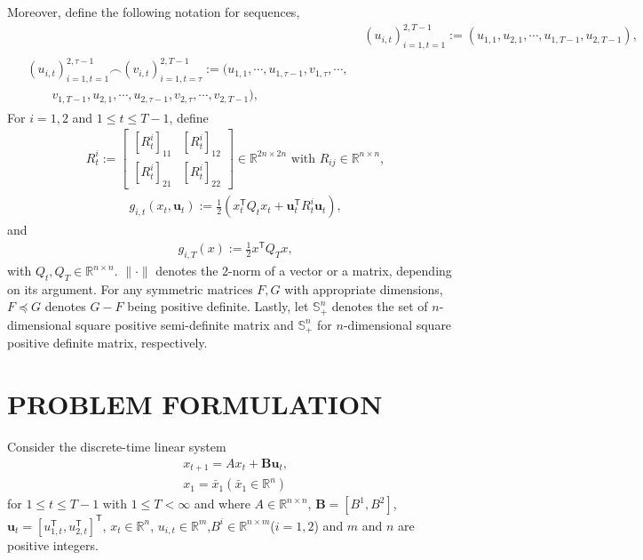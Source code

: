 \documentclass[letterpaper, 10 pt, conference]{ieeeconf}  %
\newcommand{\transpose}{\mathsf{T}}
\begin{document}
Moreover, define the following notation for sequences,
\begin{align}
    &(u_{i,t})_{i=1,t=1}^{2,T-1} := (u_{1,1},u_{2,1},\cdots, u_{1,T-1},u_{2,T-1}),\\
    \begin{split}
         &(u_{i,t})_{i=1,t=1}^{2,\tau-1} \frown (v_{i,t})_{i=1,t=\tau}^{2,T-1}:=(u_{1,1},\cdots,u_{1,\tau-1},v_{1,\tau},\cdots,\\
    &\qquad v_{1,T-1},u_{2,1},\cdots,u_{2,\tau-1},v_{2,\tau},\cdots,v_{2,T-1} ),
    \end{split}
    \end{align}
    For $i=1,2$ and $1\leq t \leq T-1$, define
    \begin{align}
   &R_{t}^{i} := 
   \begin{bmatrix}
       [R_{t}^{i}]_{11} & [R_{t}^{i}]_{12}\\
       [R_{t}^{i}]_{21} & [R_{t}^{i}]_{22}
   \end{bmatrix}\in \mathbb{R}^{2n\times 2n}\text{ with }R_{ij}\in \mathbb{R}^{n\times n},
   \end{align}
   \begin{align}
    &g_{i,t}(x_{t}, \mathbf{u}_{t}) := \frac{1}{2}(x_{t}^{\mathsf{T}}Q_{t}x_{t} + 
    \mathbf{u}_{t}^{\transpose}R_{t}^{i}\mathbf{u}_{t}),
    \end{align}
    and
    \begin{align}
    &g_{i,T}(x) := \frac{1}{2} x^{\mathsf{T}}Q_{T}x,
\end{align}
with $Q_{t}, Q_{T} \in \mathbb{R}^{n\times n}$. $\|\cdot\|$ denotes the 2-norm of a vector or a matrix, depending on its argument. For any symmetric matrices $F,G$ with appropriate dimensions, $F \preceq G$ denotes $G-F$ being positive definite.
Lastly, let $\mathbb{S}_{+}^{n}$ denotes the set of $n$-dimensional square positive semi-definite matrix and $\mathbb{S}_{+}^{n}$ for $n$-dimensional square positive definite matrix, respectively.


\section{PROBLEM FORMULATION}
Consider the discrete-time linear system
\begin{align}
    &x_{t+1} = Ax_{t} + \mathbf{B}\mathbf{u}_{t}\label{eq:linsys},\\
    &x_{1} =\bar{x}_{1}(\bar{x}_1 \in \mathbb{R}^{n})\label{eq:initialx}
\end{align}
for $1\leq t \leq T-1$ with $1\leq T < \infty$ and where $A \in \mathbb{R}^{n\times n}$, $\mathbf{B} = [B^{1}, B^{2}]$, $\mathbf{u}_{t} = [u_{1,t}^{\transpose},u_{2,t}^{\transpose}]^{\transpose}$, $x_{t}\in\mathbb{R}^n$, $u_{i,t} \in \mathbb{R}^{m}$,$B^{i} \in \mathbb{R}^{n\times m}$($i = 1,2$) and $m$ and $n$ are positive integers.
\end{document}
